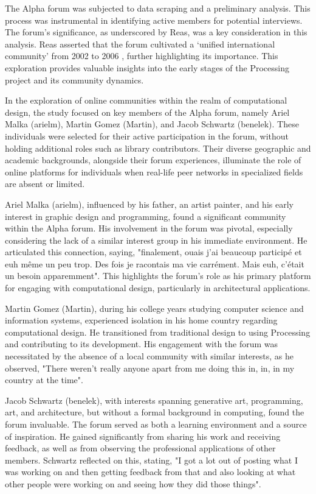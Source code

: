 The Alpha forum was subjected to data scraping and a preliminary analysis. This process was instrumental in identifying active members for potential interviews. The forum’s significance, as underscored by Reas, was a key consideration in this analysis. Reas asserted that the forum cultivated a ‘unified international community’ from 2002 to 2006 \parencite[331]{conradGraphicDesignPostdigital2021}, further highlighting its importance. This exploration provides valuable insights into the early stages of the Processing project and its community dynamics.

In the exploration of online communities within the realm of computational design, the study focused on key members of the Alpha forum, namely Ariel Malka (arielm), Martin Gomez (Martin), and Jacob Schwartz (benelek). These individuals were selected for their active participation in the forum, without holding additional roles such as library contributors. Their diverse geographic and academic backgrounds, alongside their forum experiences, illuminate the role of online platforms for individuals when real-life peer networks in specialized fields are absent or limited.

Ariel Malka (arielm), influenced by his father, an artist painter, and his early interest in graphic design and programming, found a significant community within the Alpha forum. His involvement in the forum was pivotal, especially considering the lack of a similar interest group in his immediate environment. He articulated this connection, saying, "finalement, ouais j'ai beaucoup participé et euh même un peu trop. Des fois je racontais ma vie carrément. Mais euh, c'était un besoin apparemment"​​. This highlights the forum's role as his primary platform for engaging with computational design, particularly in architectural applications.

Martin Gomez (Martin), during his college years studying computer science and information systems, experienced isolation in his home country regarding computational design. He transitioned from traditional design to using Processing and contributing to its development. His engagement with the forum was necessitated by the absence of a local community with similar interests, as he observed, "There weren't really anyone apart from me doing this in, in, in my country at the time"​​.

Jacob Schwartz (benelek), with interests spanning generative art, programming, art, and architecture, but without a formal background in computing, found the forum invaluable. The forum served as both a learning environment and a source of inspiration. He gained significantly from sharing his work and receiving feedback, as well as from observing the professional applications of other members. Schwartz reflected on this, stating, "I got a lot out of posting what I was working on and then getting feedback from that and also looking at what other people were working on and seeing how they did those things"​​.

